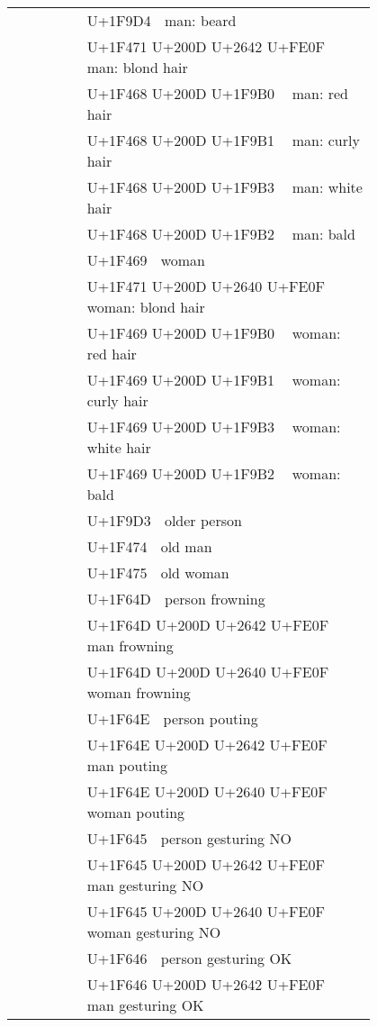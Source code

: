 \documentclass[a4paper,12pt]{ltjarticle}
\newcommand{\fontA}[1]{{\fontspec[RawFeature={mode=harf,dist,ccmp}]{Segoe UI Emoji} #1}}
\newcommand{\fontB}[1]{{\fontspec[RawFeature={mode=harf,dist,ccmp}]{Noto Color Emoji} #1}}
\begin{document}
\begin{longtable}[c]{ccp{0.8\linewidth}}
\fontA{🧔}&\fontB{🧔}&U+1F9D4 🧔 man: beard\\
\fontA{👱‍♂️}&\fontB{👱‍♂️}&U+1F471 U+200D U+2642 U+FE0F 👱‍♂️ man: blond hair\\
\fontA{👨‍🦰}&\fontB{👨‍🦰}&U+1F468 U+200D U+1F9B0 👨‍🦰 man: red hair\\
\fontA{👨‍🦱}&\fontB{👨‍🦱}&U+1F468 U+200D U+1F9B1 👨‍🦱 man: curly hair\\
\fontA{👨‍🦳}&\fontB{👨‍🦳}&U+1F468 U+200D U+1F9B3 👨‍🦳 man: white hair\\
\fontA{👨‍🦲}&\fontB{👨‍🦲}&U+1F468 U+200D U+1F9B2 👨‍🦲 man: bald\\
\fontA{👩}&\fontB{👩}&U+1F469 👩 woman\\
\fontA{👱‍♀️}&\fontB{👱‍♀️}&U+1F471 U+200D U+2640 U+FE0F 👱‍♀️ woman: blond hair\\
\fontA{👩‍🦰}&\fontB{👩‍🦰}&U+1F469 U+200D U+1F9B0 👩‍🦰 woman: red hair\\
\fontA{👩‍🦱}&\fontB{👩‍🦱}&U+1F469 U+200D U+1F9B1 👩‍🦱 woman: curly hair\\
\fontA{👩‍🦳}&\fontB{👩‍🦳}&U+1F469 U+200D U+1F9B3 👩‍🦳 woman: white hair\\
\fontA{👩‍🦲}&\fontB{👩‍🦲}&U+1F469 U+200D U+1F9B2 👩‍🦲 woman: bald\\
\fontA{🧓}&\fontB{🧓}&U+1F9D3 🧓 older person\\
\fontA{👴}&\fontB{👴}&U+1F474 👴 old man\\
\fontA{👵}&\fontB{👵}&U+1F475 👵 old woman\\
\fontA{🙍}&\fontB{🙍}&U+1F64D 🙍 person frowning\\
\fontA{🙍‍♂️}&\fontB{🙍‍♂️}&U+1F64D U+200D U+2642 U+FE0F 🙍‍♂️ man frowning\\
\fontA{🙍‍♀️}&\fontB{🙍‍♀️}&U+1F64D U+200D U+2640 U+FE0F 🙍‍♀️ woman frowning\\
\fontA{🙎}&\fontB{🙎}&U+1F64E 🙎 person pouting\\
\fontA{🙎‍♂️}&\fontB{🙎‍♂️}&U+1F64E U+200D U+2642 U+FE0F 🙎‍♂️ man pouting\\
\fontA{🙎‍♀️}&\fontB{🙎‍♀️}&U+1F64E U+200D U+2640 U+FE0F 🙎‍♀️ woman pouting\\
\fontA{🙅}&\fontB{🙅}&U+1F645 🙅 person gesturing NO\\
\fontA{🙅‍♂️}&\fontB{🙅‍♂️}&U+1F645 U+200D U+2642 U+FE0F 🙅‍♂️ man gesturing NO\\
\fontA{🙅‍♀️}&\fontB{🙅‍♀️}&U+1F645 U+200D U+2640 U+FE0F 🙅‍♀️ woman gesturing NO\\
\fontA{🙆}&\fontB{🙆}&U+1F646 🙆 person gesturing OK\\
\fontA{🙆‍♂️}&\fontB{🙆‍♂️}&U+1F646 U+200D U+2642 U+FE0F 🙆‍♂️ man gesturing OK\\

\end{longtable}
\end{document}
